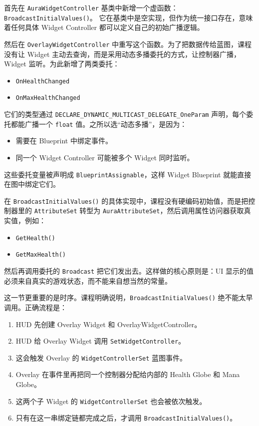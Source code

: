 首先在 \texttt{AuraWidgetController} 基类中新增一个虚函数：\texttt{BroadcastInitialValues()}。
它在基类中是空实现，但作为统一接口存在，意味着任何具体 Widget Controller 都可以定义自己的初始广播逻辑。

然后在 \texttt{OverlayWidgetController} 中重写这个函数。为了把数据传给蓝图，课程没有让 Widget 主动去查询，而是采用动态多播委托的方式，让控制器广播，Widget 监听。为此新增了两类委托：
\begin{itemize}
	\item \texttt{OnHealthChanged}
	\item \texttt{OnMaxHealthChanged}
\end{itemize}

它们的类型通过 \texttt{DECLARE\_DYNAMIC\_MULTICAST\_DELEGATE\_OneParam} 声明，每个委托都能广播一个 \texttt{float} 值。之所以选“动态多播”，是因为：
\begin{itemize}
	\item 需要在 Blueprint 中绑定事件。
	\item 同一个 Widget Controller 可能被多个 Widget 同时监听。
\end{itemize}

这些委托变量被声明成 \texttt{BlueprintAssignable}，这样 Widget Blueprint 就能直接在图中绑定它们。

在 \texttt{BroadcastInitialValues()} 的具体实现中，课程没有硬编码初始值，而是把控制器里的 \texttt{AttributeSet} 转型为 \texttt{AuraAttributeSet}，然后调用属性访问器获取真实值，例如：
\begin{itemize}
	\item \texttt{GetHealth()}
	\item \texttt{GetMaxHealth()}
\end{itemize}

然后再调用委托的 \texttt{Broadcast} 把它们发出去。这样做的核心原则是：UI 显示的值必须来自真实的游戏状态，而不能来自想当然的常量。

这一节更重要的是时序。课程明确说明，\texttt{BroadcastInitialValues()} 绝不能太早调用。正确流程是：
\begin{enumerate}
	\item HUD 先创建 Overlay Widget 和 OverlayWidgetController。
	\item HUD 给 Overlay Widget 调用 \texttt{SetWidgetController}。
	\item 这会触发 Overlay 的 \texttt{WidgetControllerSet} 蓝图事件。
	\item Overlay 在事件里再把同一个控制器分配给内部的 Health Globe 和 Mana Globe。
	\item 这两个子 Widget 的 \texttt{WidgetControllerSet} 也会被依次触发。
	\item 只有在这一串绑定链都完成之后，才调用 \texttt{BroadcastInitialValues()}。
\end{enumerate}


